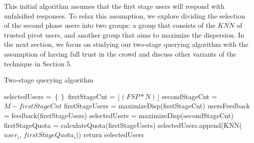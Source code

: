 \documentclass{acm_proc_article-sp}
\newcommand\floor[1]{\lfloor#1\rfloor}
\begin{document}
This initial algorithm assumes that the first stage users will respond with unfalsified responses. To relax this assumption, we explore dividing the selection of the second phase users into two groups: a group that consists of the $KNN$ of trusted pivot users, and another group that aims to maximize the dispersion. In the next section, we focus on studying our two-stage querying algorithm with the assumption of having full trust in the crowd and discuss other variants of the technique in Section 5.\par
\begin{algorithm}
\caption{Two-stage querying algorithm}
\label{TSalgorithm}
 \begin{algorithmic}[1]
         \State selectedUsers = $\left\{\right\}$
         \State firstStageCnt = $\floor{(FSP*N)}$
         \State secondStageCnt = $M - firstStageCnt$
         \State firstStageUsers = maximizeDisp(firstStageCnt)
         \State usersFeedback = feedback(firstStageUsers)
                \State selectedUsers = maximizeDisp(secondStageCnt){}
         \Else
         \EndIf 
       \State firstStageQuota = calculateQuota(firstStageUsers)
     \State selectedUsers.append(KNN($user_i$, $firstStageQuota_i$))
   \EndFor
\State return {selectedUsers}
\EndFunction
\end{algorithmic}
\end{algorithm}
\end{document}
